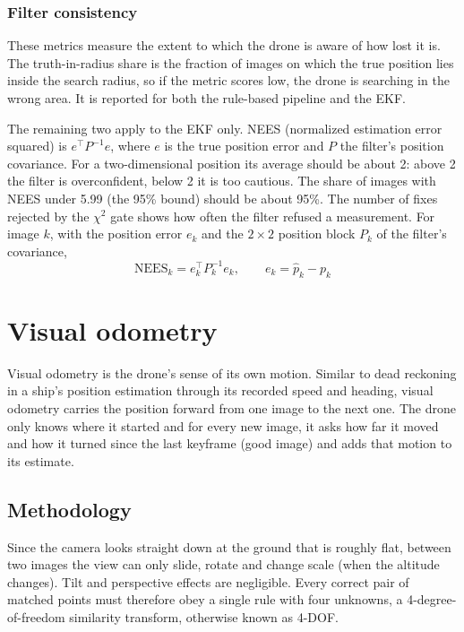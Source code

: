 \documentclass[english, Lau, oneside]{sapthesis}%
\begin{document}
\subsection{Filter consistency}
\label{sec:metrics-filter}
These metrics measure the extent to which the drone is aware of how lost it is. The truth-in-radius share is the fraction of images on which the true position lies inside the search radius, so if the metric scores low, the drone is searching in the wrong area. It is reported for both the rule-based pipeline and the EKF.

The remaining two apply to the EKF only. NEES (normalized estimation error squared) \citep{barshalom2001} is $e^{\top} P^{-1} e$, where $e$ is the true position error and $P$ the filter's position covariance. For a two-dimensional position its average should be about 2: above 2 the filter is overconfident, below 2 it is too cautious. The share of images with NEES under 5.99 (the 95\% bound) should be about 95\%. The number of fixes rejected by the $\chi^2$ gate shows how often the filter refused a measurement. For image $k$, with the position error $e_k$ and the $2 \times 2$ position block $P_k$ of the filter's covariance,
\begin{equation}
  \mathrm{NEES}_k = e_k^{\top} P_k^{-1} e_k, \qquad e_k = \hat{p}_k - p_k
  \label{eq:nees}
\end{equation}

\chapter{Visual odometry}
\label{chap:vo}
Visual odometry is the drone's sense of its own motion. Similar to dead reckoning in a ship's position estimation through its recorded speed and heading, visual odometry carries the position forward from one image to the next one. The drone only knows where it started and for every new image, it asks how far it moved and how it turned since the last keyframe (good image) and adds that motion to its estimate.

\section{Methodology}
\label{sec:vo-method}
Since the camera looks straight down at the ground that is roughly flat, between two images the view can only slide, rotate and change scale (when the altitude changes). Tilt and perspective effects are negligible. Every correct pair of matched points must therefore obey a single rule with four unknowns, a 4-degree-of-freedom similarity transform, otherwise known as 4-DOF.
\end{document}
